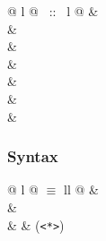 \begin{isabellebody}
\begin{isamarkuptext}
\begin{supertabular}{@ {} l @ {~::~} l @ {}}
\isa{{\isacharparenleft}{\isacharparenright}} & \\
 & \\
 & \\
 & \\
 & \\
 & \\
 & \\
\end{supertabular}

\subsubsection*{Syntax}

\begin{tabular}{@ {} l @ {\quad$\equiv$\quad} ll @ {}}
 & \\
 & \\
 &   & (\verb$<*>$)
\end{tabular}


\end{isamarkuptext}
\end{isabellebody}
